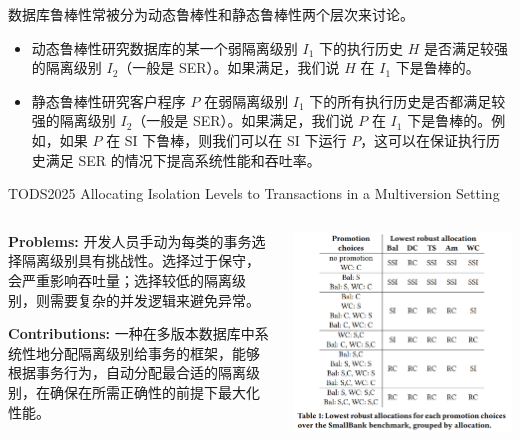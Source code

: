 
\begin{frame}{}
	数据库鲁棒性常被分为动态鲁棒性和静态鲁棒性两个层次来讨论。

	\begin{itemize}
		\item 动态鲁棒性研究数据库的某一个弱隔离级别 $I_1$ 下的执行历史 $H$ 是否满足较强的隔离级别 $I_2$（一般是 SER）。如果满足，我们说 $H$ 在 $I_1$ 下是鲁棒的。
		\item 静态鲁棒性研究客户程序 $P$ 在弱隔离级别 $I_1$ 下的所有执行历史是否都满足较强的隔离级别 $I_2$（一般是 SER）。如果满足，我们说 $P$ 在 $I_1$ 下是鲁棒的。例如，如果 $P$ 在 SI 下鲁棒，则我们可以在 SI 下运行 $P$，这可以在保证执行历史满足 SER 的情况下提高系统性能和吞吐率。
	\end{itemize}
\end{frame}

\begin{frame}{}
	
\end{frame}

\begin{frame}{TODS2025 Allocating Isolation Levels to Transactions in a Multiversion Setting}
	\begin{columns}
		\begin{column}{0.5\textwidth}
			\textbf{Problems: }开发人员手动为每类的事务选择隔离级别具有挑战性。选择过于保守，会严重影响吞吐量；选择较低的隔离级别，则需要复杂的并发逻辑来避免异常。

			\textbf{Contributions: }一种在多版本数据库中系统性地分配隔离级别给事务的框架，能够根据事务行为，自动分配最合适的隔离级别，在确保在所需正确性的前提下最大化性能。
		\end{column}
		\begin{column}{0.5\textwidth}
			\includegraphics[width=0.98\linewidth]{figs/lowest-robust-allocations}
		\end{column}
	\end{columns}
\end{frame}


